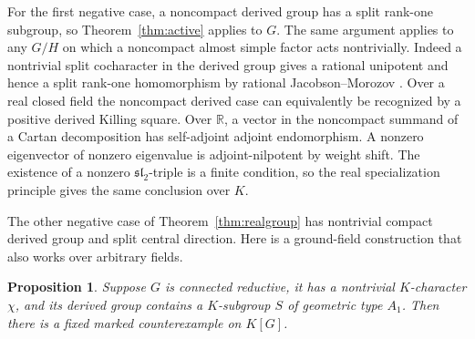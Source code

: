 \documentclass[11pt]{article}
\newtheorem{proposition}[theorem]{Proposition}
\newcommand{\RR}{\mathbb R}
\begin{document}
For the first negative case, a noncompact derived group has a split
rank-one subgroup, so Theorem~\ref{thm:active} applies to \(G\).
The same argument applies to any \(G/H\) on which a noncompact almost
simple factor acts nontrivially. Indeed a nontrivial split
cocharacter in the derived group gives a rational unipotent and
hence a split rank-one homomorphism by rational Jacobson--Morozov
\cite{JM}. Over a real closed field the noncompact derived case can
equivalently be recognized by a positive derived Killing square.
Over \(\RR\), a vector in the noncompact summand of a Cartan
decomposition has self-adjoint adjoint endomorphism. A nonzero
eigenvector of nonzero eigenvalue is adjoint-nilpotent by weight
shift. The existence of a nonzero \(\mathfrak{sl}_2\)-triple is a
finite condition, so the real specialization principle gives
the same conclusion over \(K\).

The other negative case of Theorem~\ref{thm:realgroup} has nontrivial
compact derived group and split central direction. Here is a
ground-field construction that also works over arbitrary fields.

\begin{proposition}\label{prop:central}
Suppose \(G\) is connected reductive, it has a nontrivial \(K\)-character
\(\chi\), and its derived group contains a \(K\)-subgroup \(S\) of
geometric type \(A_1\). Then there is a fixed marked counterexample
on \(K[G]\).
\end{proposition}
\end{document}
